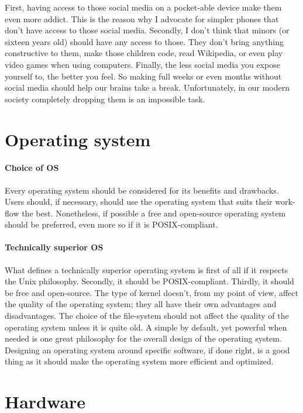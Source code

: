 \documentclass[a4paper,10pt]{article}
\begin{document}
First, having access to those social media on a pocket-able device make them even more addict. This is the reason why I advocate for simpler phones that don't have access to those social media. Secondly, I don't think that minors (or sixteen years old) should have any access to those. They don't bring anything constructive to them, make those children code, read Wikipedia, or even play video games when using computers. Finally, the less social media you expose yourself to, the better you feel. So making full weeks or even months without social media should help our brains take a break. Unfortunately, in our modern society completely dropping them is an impossible task.

\pagebreak

\section{Operating system}

\paragraph{Choice of OS}

Every operating system should be considered for its benefits and drawbacks. Users should, if necessary, should use the operating system that suits their work-flow the best. Nonetheless, if possible a free and open-source operating system should be preferred, even more so if it is POSIX-compliant.

\paragraph{Technically superior OS}

What defines a technically superior operating system is first of all if it respects the Unix philosophy. Secondly, it should be POSIX-compliant. Thirdly, it should be free and open-source. The type of kernel doesn't, from my point of view, affect the quality of the operating system; they all have their own advantages and disadvantages. The choice of the file-system should not affect the quality of the operating system unless it is quite old. A simple by default, yet powerful when needed is one great philosophy for the overall design of the operating system. Designing an operating system around specific software, if done right, is a good thing as it should make the operating system more efficient and optimized.

\section{Hardware}
\end{document}
